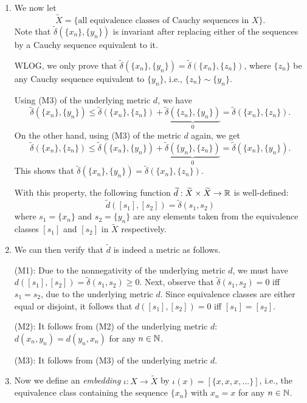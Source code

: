 \begin{enumerate}
\item We now let
\[
\widetilde{X}=\{\text{all equivalence classes of Cauchy sequences in \(X\)}\}.
\]
Note that \(\widetilde{\delta}(\{x_n\},\{y_n\})\) is invariant after replacing
either of the sequences by a Cauchy sequence equivalent to it.

\begin{pf}
WLOG, we only prove that
\(\widetilde{\delta}(\{x_n\},\{y_n\})=\widetilde{\delta}(\{x_n\},\{z_n\})\), where
\(\{z_n\}\) be any Cauchy sequence equivalent to \(\{y_n\}\), i.e.,
\(\{z_n\}\sim\{y_n\}\).

Using (M3) of the underlying metric \(d\), we have
\[
\widetilde{\delta}(\{x_n\},\{y_n\})\le
\widetilde{\delta}(\{x_n\},\{z_n\})+\underbrace{\widetilde{\delta}(\{z_n\},\{y_n\})}_{0}
=\widetilde{\delta}(\{x_n\},\{z_n\}).
\]
On the other hand, using (M3) of the metric \(d\) again, we get
\[
\widetilde{\delta}(\{x_n\},\{z_n\})\le
\widetilde{\delta}(\{x_n\},\{y_n\})+\underbrace{\widetilde{\delta}(\{y_n\},\{z_n\})}_{0}
=\widetilde{\delta}(\{x_n\},\{y_n\}).
\]
This shows that
\(\widetilde{\delta}(\{x_n\},\{y_n\})=\widetilde{\delta}(\{x_n\},\{z_n\})\).
\end{pf}

With this property, the following function \(\widetilde{d}:\widetilde{X}\times
\widetilde{X}\to\mathbb{R}\) is well-defined:
\[
\widetilde{d}([s_1],[s_2])=\widetilde{\delta}(s_1,s_2)
\]
where \(s_1=\{x_n\}\) and \(s_2=\{y_n\}\) are any elements taken from the equivalence classes
\([s_1]\) and \([s_2]\) in \(\widetilde{X}\) respectively.


\item We can then verify that \(\widetilde{d}\) is indeed a metric as follows.

\begin{pf}
(M1): Due to the nonnegativity of the underlying metric \(d\), we must have
\(d([s_1],[s_2])=\widetilde{\delta}(s_1,s_2)\ge 0\). Next, observe that
\(\widetilde{\delta}(s_1,s_2)=0\) iff \(s_1=s_2\), due to the underlying metric
\(d\). Since equivalence classes are either equal or disjoint, it follows that
\(d([s_1],[s_2])=0\) iff \([s_1]=[s_2]\).

(M2): It follows from (M2) of the underlying metric \(d\):
\(d(x_n,y_n)=d(y_n,x_n)\) for any \(n\in\mathbb{N}\).

(M3): It follows from (M3) of the underlying metric \(d\).
\end{pf}

\item Now we define an \emph{embedding} \(\iota:X\to\widetilde{X}\) by
\(\iota(x)=[\{x,x,x,\dotsc\}]\), i.e., the equivalence class containing the
sequence \(\{x_n\}\) with \(x_n=x\) for any \(n\in\mathbb{N}\).


\end{enumerate}
